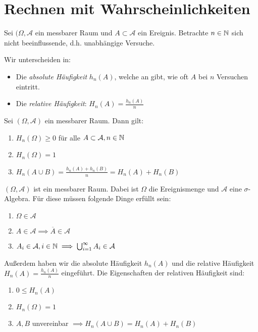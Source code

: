 \section{Rechnen mit Wahrscheinlichkeiten}
Sei $(\Omega, \mathcal{A}$ ein messbarer Raum und $A \subset \mathcal{A}$ ein Ereignis. Betrachte $n \in \mathbb{N}$  sich nicht beeinflussende, d.h. unabhängige Versuche.

\begin{definition}[Häufigkeiten]
	Wir unterscheiden in:
	\begin{itemize}
		\item Die \emph{absolute Häufigkeit} $h_n(A)$, welche an gibt, wie oft $A$ bei $n$ Versuchen eintritt.
		\item Die \emph{relative Häufigkeit}: $H_n(A) = \frac{h_n(A)}{n}$
	\end{itemize}
\end{definition}
\begin{theorem}
	\label{thm:motivation-axiome}
	Sei $(\Omega, \mathcal{A})$ ein messbarer Raum. Dann gilt:
	\begin{enumerate}
		\item $H_n(\Omega) \ge 0$ für alle $A \subset \mathcal{A}, n \in \mathbb{N}$
		\item $H_n(\Omega)=1$
		\item $H_n(A \cup B) = \frac{h_n(A)+h_n(B)}{n}= H_n(A)+H_n(B)$ 
	\end{enumerate}

\end{theorem}
\begin{recall}
	$(\Omega, \mathcal{A})$ ist ein messbarer Raum. Dabei ist $\Omega$ die Ereignismenge und $\mathcal{A}$ eine $\sigma$-Algebra. Für diese müssen folgende Dinge erfüllt sein:
	\begin{enumerate}
		\item $\Omega \in \mathcal{A}$
		\item $A \in \mathcal{A} \implies \overline{A}\in \mathcal{A}$
		\item $A_i \in \mathcal{A}, i \in \mathbb{N} \implies \bigcup_{i=1}^{\infty} A_i \in \mathcal{A}$ 
	\end{enumerate}
Außerdem haben wir die absolute Häufigkeit $h_n(A)$ und die relative Häufigkeit $H_n(A) = \frac{h_n(A)}{n}$ eingeführt. Die Eigenschaften der relativen Häufigkeit sind:
\begin{enumerate}[label=\arabic*)]
	\item $0 \le H_n(A)$
	\item $H_n(\Omega) = 1$
	\item $A,B$ unvereinbar $\implies H_n(A \cup B) = H_n(A) + H_n(B)$ 
\end{enumerate}
\end{recall}
